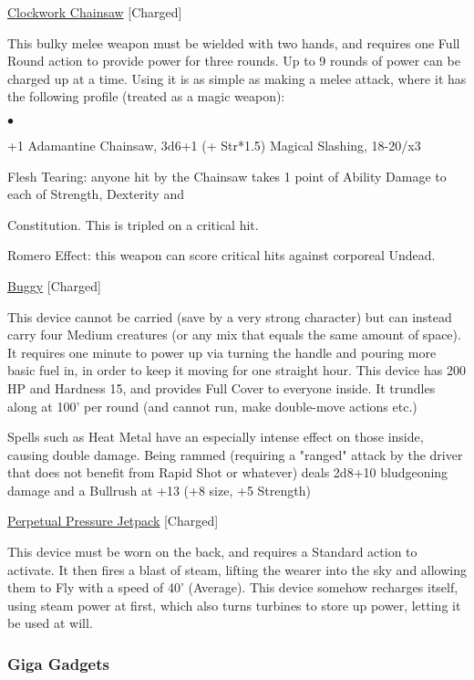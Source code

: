 \medskip\noindent\underline{Clockwork Chainsaw} [Charged]

\noindent This bulky melee weapon must be wielded with two hands, and requires one Full Round action to provide power for three rounds. Up to 9 rounds of power can be charged up at a time. Using it is as simple as making a melee attack, where it has the following profile (treated as a magic weapon):

\begin{list}{$\bullet$}{\itemspace}
\item +1 Adamantine Chainsaw, 3d6+1 (+ Str*1.5) Magical Slashing, 18-20/x3
\item Flesh Tearing: anyone hit by the Chainsaw takes 1 point of Ability Damage to each of Strength, Dexterity and \item Constitution. This is tripled on a critical hit.
\item Romero Effect: this weapon can score critical hits against corporeal Undead.
\end{list}

\medskip\noindent\underline{Buggy} [Charged]

\noindent This device cannot be carried (save by a very strong character) but can instead carry four Medium creatures (or any mix that equals the same amount of space). It requires one minute to power up via turning the handle and pouring more basic fuel in, in order to keep it moving for one straight hour. This device has 200 HP and Hardness 15, and provides Full Cover to everyone inside. It trundles along at 100' per round (and cannot run, make double-move actions etc.)

\smallskip\noindent Spells such as Heat Metal have an especially intense effect on those inside, causing double damage. Being rammed (requiring a "ranged" attack by the driver that does not benefit from Rapid Shot or whatever) deals 2d8+10 bludgeoning damage and a Bullrush at +13 (+8 size, +5 Strength)

\medskip\noindent\underline{Perpetual Pressure Jetpack} [Charged]

\noindent This device must be worn on the back, and requires a Standard action to activate. It then fires a blast of steam, lifting the wearer into the sky and allowing them to Fly with a speed of 40' (Average). This device somehow recharges itself, using steam power at first, which also turns turbines to store up power, letting it be used at will.

\subsubsection{Giga Gadgets}


